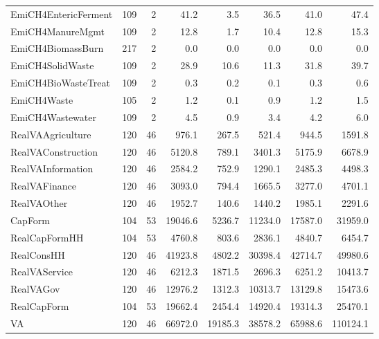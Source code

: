 {\begin{tabular}[t]{lrrrrrrr}
EmiCH4EntericFerment & 109 & 2 & \num{41.2} & \num{3.5} & \num{36.5} & \num{41.0} & \num{47.4}\\
EmiCH4ManureMgmt & 109 & 2 & \num{12.8} & \num{1.7} & \num{10.4} & \num{12.8} & \num{15.3}\\
EmiCH4BiomassBurn & 217 & 2 & \num{0.0} & \num{0.0} & \num{0.0} & \num{0.0} & \num{0.0}\\
EmiCH4SolidWaste & 109 & 2 & \num{28.9} & \num{10.6} & \num{11.3} & \num{31.8} & \num{39.7}\\
EmiCH4BioWasteTreat & 109 & 2 & \num{0.3} & \num{0.2} & \num{0.1} & \num{0.3} & \num{0.6}\\
EmiCH4Waste & 105 & 2 & \num{1.2} & \num{0.1} & \num{0.9} & \num{1.2} & \num{1.5}\\
EmiCH4Wastewater & 109 & 2 & \num{4.5} & \num{0.9} & \num{3.4} & \num{4.2} & \num{6.0}\\
RealVAAgriculture & 120 & 46 & \num{976.1} & \num{267.5} & \num{521.4} & \num{944.5} & \num{1591.8}\\
RealVAConstruction & 120 & 46 & \num{5120.8} & \num{789.1} & \num{3401.3} & \num{5175.9} & \num{6678.9}\\
RealVAInformation & 120 & 46 & \num{2584.2} & \num{752.9} & \num{1290.1} & \num{2485.3} & \num{4498.3}\\
RealVAFinance & 120 & 46 & \num{3093.0} & \num{794.4} & \num{1665.5} & \num{3277.0} & \num{4701.1}\\
RealVAOther & 120 & 46 & \num{1952.7} & \num{140.6} & \num{1440.2} & \num{1985.1} & \num{2291.6}\\
CapForm & 104 & 53 & \num{19046.6} & \num{5236.7} & \num{11234.0} & \num{17587.0} & \num{31959.0}\\
RealCapFormHH & 104 & 53 & \num{4760.8} & \num{803.6} & \num{2836.1} & \num{4840.7} & \num{6454.7}\\
RealConsHH & 120 & 46 & \num{41923.8} & \num{4802.2} & \num{30398.4} & \num{42714.7} & \num{49980.6}\\
RealVAService & 120 & 46 & \num{6212.3} & \num{1871.5} & \num{2696.3} & \num{6251.2} & \num{10413.7}\\
RealVAGov & 120 & 46 & \num{12976.2} & \num{1312.3} & \num{10313.7} & \num{13129.8} & \num{15473.6}\\
RealCapForm & 104 & 53 & \num{19662.4} & \num{2454.4} & \num{14920.4} & \num{19314.3} & \num{25470.1}\\
VA & 120 & 46 & \num{66972.0} & \num{19185.3} & \num{38578.2} & \num{65988.6} & \num{110124.1}\\

\end{tabular}}
